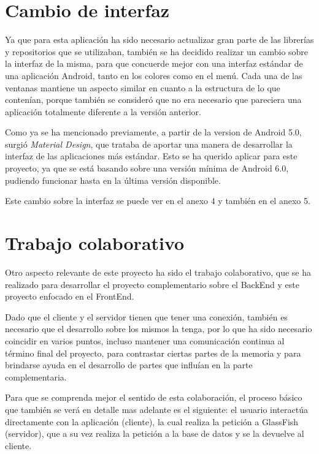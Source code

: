 \section{Cambio de interfaz}

Ya que para esta aplicación ha sido necesario actualizar gran parte de las librerías y repositorios que se utilizaban, también se ha decidido realizar un cambio sobre la interfaz de la misma, para que concuerde mejor con una interfaz estándar de una aplicación Android, tanto en los colores como en el menú. Cada una de las ventanas mantiene un aspecto similar en cuanto a la estructura de lo que contenían, porque también se consideró que no era necesario que pareciera una aplicación totalmente diferente a la versión anterior. 

Como ya se ha mencionado previamente, a partir de la version de Android 5.0, surgió \textit{Material Design}, que trataba de aportar una manera de desarrollar la interfaz de las aplicaciones más estándar. Esto se ha querido aplicar para este proyecto, ya que se está basando sobre una versión mínima de Android 6.0, pudiendo funcionar hasta en la última versión disponible.

Este cambio sobre la interfaz se puede ver en el anexo 4 y también en el anexo 5.

\section{Trabajo colaborativo}
 
Otro aspecto relevante de este proyecto ha sido el trabajo colaborativo, que se ha realizado para desarrollar el proyecto complementario sobre el BackEnd \cite{tfg2} y este proyecto enfocado en el FrontEnd.

Dado que el cliente y el servidor tienen que tener una conexión, también es necesario que el desarrollo sobre los mismos la tenga, por lo que ha sido necesario coincidir en varios puntos, incluso mantener una comunicación continua al término final del proyecto, para contrastar ciertas partes de la memoria y para brindarse ayuda en el desarrollo de partes que influían en la parte complementaria.

Para que se comprenda mejor el sentido de esta colaboración, el proceso básico que también se verá en detalle mas adelante es el siguiente: el usuario interactúa directamente con la aplicación (cliente), la cual realiza la petición a GlassFish (servidor), que a su vez realiza la petición a la base de datos y se la devuelve al cliente. 

